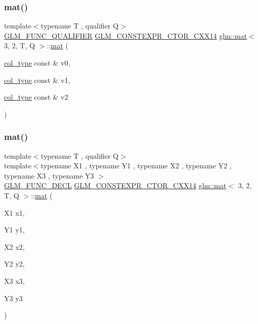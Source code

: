 \subsubsection{\texorpdfstring{mat()}{mat()}\hspace{0.1cm}{\footnotesize\ttfamily [6/21]}}
{\footnotesize\ttfamily template$<$typename T , qualifier Q$>$ \\
\mbox{\hyperlink{setup_8hpp_a33fdea6f91c5f834105f7415e2a64407}{G\+L\+M\+\_\+\+F\+U\+N\+C\+\_\+\+Q\+U\+A\+L\+I\+F\+I\+ER}} \mbox{\hyperlink{setup_8hpp_a0900f9145e68bf6061b6f5e7be3fa751}{G\+L\+M\+\_\+\+C\+O\+N\+S\+T\+E\+X\+P\+R\+\_\+\+C\+T\+O\+R\+\_\+\+C\+X\+X14}} \mbox{\hyperlink{structglm_1_1mat}{glm\+::mat}}$<$ 3, 2, T, Q $>$\+::\mbox{\hyperlink{structglm_1_1mat}{mat}} (\begin{DoxyParamCaption}\item[{\mbox{\hyperlink{structglm_1_1mat_3_013_00_012_00_01_t_00_01_q_01_4_aa610dcaaae528e1eea8bdaaa435ad3a4}{col\+\_\+type}} const \&}]{v0,  }\item[{\mbox{\hyperlink{structglm_1_1mat_3_013_00_012_00_01_t_00_01_q_01_4_aa610dcaaae528e1eea8bdaaa435ad3a4}{col\+\_\+type}} const \&}]{v1,  }\item[{\mbox{\hyperlink{structglm_1_1mat_3_013_00_012_00_01_t_00_01_q_01_4_aa610dcaaae528e1eea8bdaaa435ad3a4}{col\+\_\+type}} const \&}]{v2 }\end{DoxyParamCaption})}

\mbox{\label{structglm_1_1mat_3_013_00_012_00_01_t_00_01_q_01_4_ad916b01b7ace64b7e07d347b804a1e5a}} 
\subsubsection{\texorpdfstring{mat()}{mat()}\hspace{0.1cm}{\footnotesize\ttfamily [7/21]}}
{\footnotesize\ttfamily template$<$typename T , qualifier Q$>$ \\
template$<$typename X1 , typename Y1 , typename X2 , typename Y2 , typename X3 , typename Y3 $>$ \\
\mbox{\hyperlink{setup_8hpp_ab2d052de21a70539923e9bcbf6e83a51}{G\+L\+M\+\_\+\+F\+U\+N\+C\+\_\+\+D\+E\+CL}} \mbox{\hyperlink{setup_8hpp_a0900f9145e68bf6061b6f5e7be3fa751}{G\+L\+M\+\_\+\+C\+O\+N\+S\+T\+E\+X\+P\+R\+\_\+\+C\+T\+O\+R\+\_\+\+C\+X\+X14}} \mbox{\hyperlink{structglm_1_1mat}{glm\+::mat}}$<$ 3, 2, T, Q $>$\+::\mbox{\hyperlink{structglm_1_1mat}{mat}} (\begin{DoxyParamCaption}\item[{X1}]{x1,  }\item[{Y1}]{y1,  }\item[{X2}]{x2,  }\item[{Y2}]{y2,  }\item[{X3}]{x3,  }\item[{Y3}]{y3 }\end{DoxyParamCaption})}

